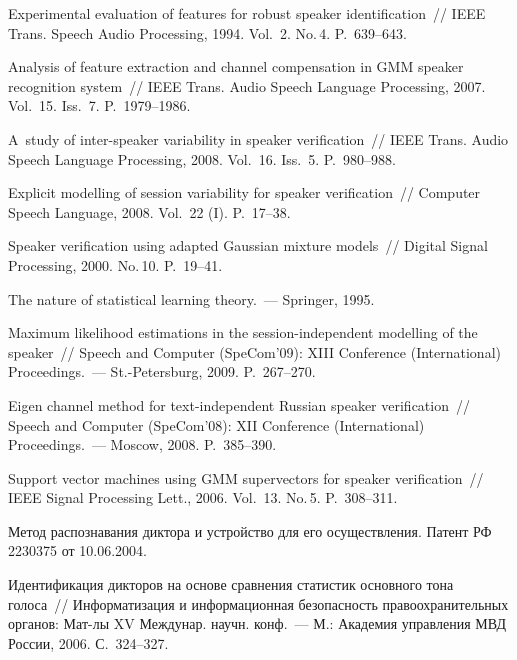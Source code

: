 \begin{multicols}{2}
{{\begin{thebibliography}{99}
   Experimental evaluation of features for robust speaker 
identification~// IEEE Trans. Speech Audio Processing, 1994. Vol.~2. 
No.\,4. P.~639--643.

 Analysis of feature extraction and channel compensation in GMM speaker recognition 
system~// IEEE Trans. Audio Speech Language Processing, 2007. Vol.~15. 
Iss.~7. P.~1979--1986.
  
  A~study of inter-speaker variability in speaker verification~// IEEE Trans. 
Audio Speech Language Processing, 2008. Vol.~16. Iss.~5. P.~980--988.
  
   Explicit modelling of session variability for speaker 
verification~// Computer Speech Language, 2008. Vol.~22 (I). P.~17--38. 


Speaker verification using adapted Gaussian mixture models~// Digital Signal 
Processing, 2000. No.\,10. P.~19--41.
  
   The nature of statistical learning theory.~--- Springer, 1995.
  
 
  Maximum likelihood estimations in the session-independent modelling of the 
speaker~// Speech and Computer (SpeCom'09):  XIII 
Conference (International) Proceedings.~--- St.-Petersburg, 2009. P.~267--270.

   Eigen channel method for text-independent Russian 
speaker verification~// Speech and Computer (SpeCom'08): XII 
 Conference (International) Proceedings.~--- Moscow, 2008. P.~385--390.
  
   Support vector machines using GMM 
supervectors for speaker verification~// IEEE Signal Processing Lett., 2006. Vol.~13. 
No.\,5. P.~308--311.

  Метод распознавания диктора и устройство для его осуществления. Патент РФ 
2230375 от 10.06.2004.

\label{end\stat}
  
Идентификация дикторов на основе сравнения статистик основного тона голоса~// 
Информатизация и информационная безопасность правоохранительных органов: 
Мат-лы XV Междунар. научн. конф.~--- М.: Академия управления МВД России, 
2006. С.~324--327. 
 \end{thebibliography}
}
}


\end{multicols}       